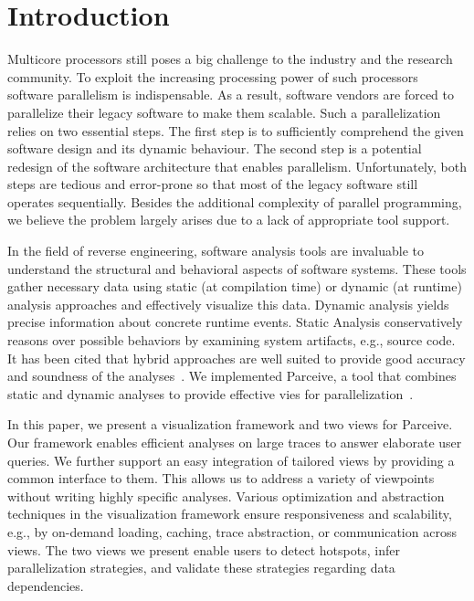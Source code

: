 \section{Introduction}
\label{sec:introduction}
Multicore processors still poses a big challenge to the industry and the
research community. To exploit the increasing processing power of such
processors software parallelism is indispensable. As a result, software vendors
are forced to parallelize their legacy software to make them scalable. Such a
parallelization relies on two essential steps. The first step is to
sufficiently comprehend the given software design and its dynamic behaviour.
The second step is a potential redesign of the software architecture that
enables parallelism. Unfortunately, both steps are tedious and error-prone so
that most of the legacy software still operates sequentially. Besides the
additional complexity of parallel programming, we believe the problem largely
arises due to a lack of appropriate tool support.

In the field of reverse engineering, software analysis tools are invaluable to
understand the structural and behavioral aspects of software systems. These
tools gather necessary data using static (at compilation time) or dynamic
(at runtime) analysis approaches and effectively visualize this data. Dynamic
analysis yields precise information about concrete runtime events. Static
Analysis conservatively reasons over possible behaviors by examining system
artifacts, e.g., source code. It has been cited that hybrid approaches are well
suited to provide good accuracy and soundness of the
analyses~\cite{StaticDynamic}. We implemented Parceive, a tool that combines
static and dynamic analyses to provide effective vies for
parallelization~\cite{Parceive}.

In this paper, we present a visualization framework and two views for Parceive.
Our framework enables efficient analyses on large traces to answer elaborate
user queries. We further support an easy integration of tailored views by
providing a common interface to them. This allows us to address a variety of
viewpoints without writing highly specific analyses. Various optimization and
abstraction techniques in the visualization framework ensure responsiveness and
scalability, e.g., by on-demand loading, caching, trace abstraction, or
communication across views. The two views we present enable users to detect
hotspots, infer parallelization strategies, and validate these strategies
regarding data dependencies.